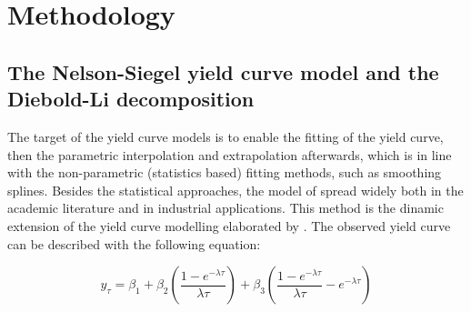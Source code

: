 \documentclass[12pt,bibliography=totoc]{article}
\begin{document}
\newpage 


\section{Methodology}
\noindent
\subsection{The Nelson-Siegel yield curve model and the Diebold-Li decomposition}


The target of the yield curve models is to enable the fitting of the yield curve, then the parametric interpolation and extrapolation afterwards, which is in line with the non-parametric (statistics based) fitting methods, such as smoothing splines.
Besides the statistical approaches, the model of \cite{diebold2006forecasting} spread widely both in the academic literature and in industrial applications. This method is the dinamic extension of the yield curve modelling elaborated by \cite{nelson1987parsimonious}. The observed yield curve can be described with the following equation:

\begin{equation}
y_{\tau}=\beta_{1}+\beta_{2}\left ( \frac{1-e^{-\lambda\tau}}{\lambda\tau} \right )+\beta_{3}\left ( \frac{1-e^{-\lambda\tau}}{\lambda\tau} -e^{-\lambda\tau}\right )
\end{equation}

\end{document}
